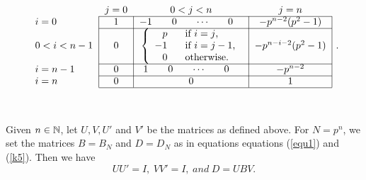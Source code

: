 \documentclass[a4paper,11pt]{amsart}
\begin{document}
\begin{equation}\begin{tabular}{ l|c|c|c| }
\multicolumn{1}{r}{}
 & \multicolumn{1}{c}{$j=0$}
 &  \multicolumn{1}{c}{$0<j<n$}
 & \multicolumn{1}{c}{$j=n$}\\
\cline{2-4}
$i=0$&1 &$\begin{matrix}-1\quad&0\quad&\cdots\quad&0\quad\end{matrix}$&$-p^{n-2}(p^2-1)$\\
\cline{2-4}
$0<i<n-1$ & 0& $\left\{\begin{array}{cl}
p&\text{if  $i=j$,}\\
-1\hspace{8pt}&\text{if  $i=j-1$,}\\
0&\text{otherwise.}    
      \end{array}\right.$&$-p^{n-i-2}(p^2-1)$\\
\cline{2-4}
$i=n-1$ & 0 & $\begin{matrix}1\quad&0\quad&\cdots\quad&0\quad\end{matrix}$&$-p^{n-2}$\\
\cline{2-4}
$i=n$ &0 & $0$&1\\
\cline{2-4}
\end{tabular}\hspace{4pt}. %
\label{v'}\end{equation}

\

\begin{pr} Given $n\in\mathbb{N}$, let $U,V,U'$ and $V'$ be the matrices as defined above. For
$N=p^n$, we set the matrices $B=B_N$ and $D=D_N$ as in equations equations (\ref{equ1}) and (\ref{k5}).
Then we have 
$$UU'=I,\hspace{3pt} VV'=I,\hspace{3pt}and\hspace{3pt}D=UBV.$$
\end{pr}
\end{document}
